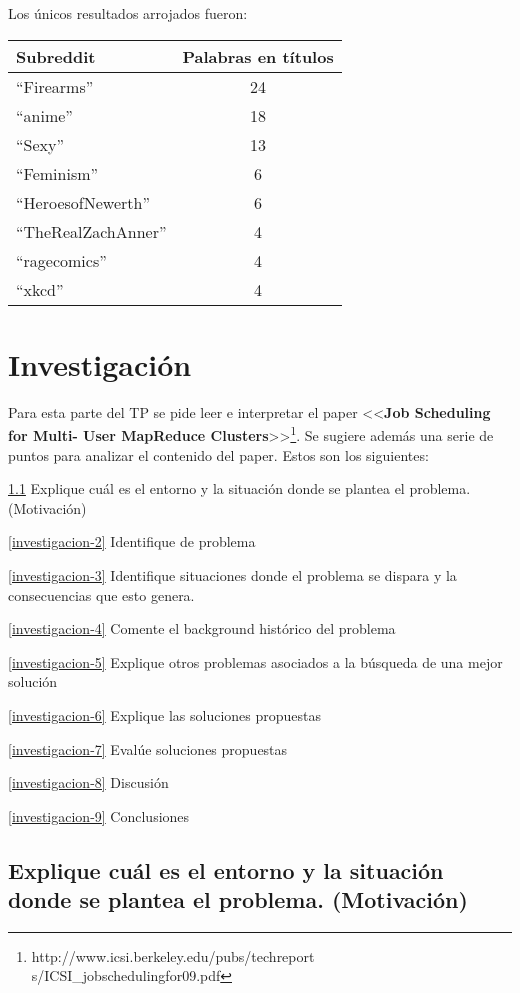 \documentclass[11pt, a4paper, twoside]{article}
\begin{document}
Los únicos resultados arrojados fueron:

\begin{center}
  \begin{tabular}{l|c}
    \textbf{Subreddit} & \textbf{Palabras en títulos} \\ \hline
    ``Firearms'' & 24 \\
    ``anime'' & 18 \\
    ``Sexy'' & 13 \\
    ``Feminism'' & 6 \\
    ``HeroesofNewerth'' & 6 \\
    ``TheRealZachAnner'' & 4 \\
    ``ragecomics'' & 4 \\
    ``xkcd'' & 4 \\
  \end{tabular}
\end{center}

\clearpage
{}
\section{Investigación}
Para esta parte del TP se pide leer e interpretar el paper <<\textbf{Job
Scheduling for Multi- User MapReduce
Clusters}>>\footnote{http://www.icsi.berkeley.edu/pubs/techreport
s/ICSI\_jobschedulingfor09.pdf}. Se sugiere además una serie de puntos
para analizar el contenido del paper. Estos son los siguientes:

\vspace{3em}
\ref{investigacion-1} Explique cuál es el entorno y la situación donde se plantea el problema. (Motivación)

\ref{investigacion-2} Identifique de problema

\ref{investigacion-3} Identifique situaciones donde el problema se dispara y la consecuencias que esto genera.

\ref{investigacion-4} Comente el background histórico del problema

\ref{investigacion-5} Explique otros problemas asociados a la búsqueda de una mejor solución

\ref{investigacion-6} Explique las soluciones propuestas

\ref{investigacion-7} Evalúe soluciones propuestas

\ref{investigacion-8} Discusión

\ref{investigacion-9} Conclusiones

\clearpage
\subsection {\footnotesize Explique cuál es el entorno y la situación donde se plantea el problema. (Motivación)}
\label{investigacion-1}
\end{document}
